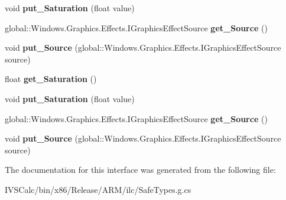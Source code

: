 \begin{DoxyCompactItemize}
void {\bfseries put\+\_\+\+Saturation} (float value)
\item 
\mbox{\label{interface_microsoft_1_1_graphics_1_1_canvas_1_1_effects_1_1_i_saturation_effect_a6d046df767aa40e632f84f8898bab4ee}} 
global\+::\+Windows.\+Graphics.\+Effects.\+I\+Graphics\+Effect\+Source {\bfseries get\+\_\+\+Source} ()
\item 
\mbox{\label{interface_microsoft_1_1_graphics_1_1_canvas_1_1_effects_1_1_i_saturation_effect_abeab04d73cf460ffaf84e878855471bd}} 
void {\bfseries put\+\_\+\+Source} (global\+::\+Windows.\+Graphics.\+Effects.\+I\+Graphics\+Effect\+Source source)
\item 
\mbox{\label{interface_microsoft_1_1_graphics_1_1_canvas_1_1_effects_1_1_i_saturation_effect_adecdc3257dffa4b9d889b825dee8bcfc}} 
float {\bfseries get\+\_\+\+Saturation} ()
\item 
\mbox{\label{interface_microsoft_1_1_graphics_1_1_canvas_1_1_effects_1_1_i_saturation_effect_a336f2121ed8c5134bdfb2dfbff7e6dc5}} 
void {\bfseries put\+\_\+\+Saturation} (float value)
\item 
\mbox{\label{interface_microsoft_1_1_graphics_1_1_canvas_1_1_effects_1_1_i_saturation_effect_a6d046df767aa40e632f84f8898bab4ee}} 
global\+::\+Windows.\+Graphics.\+Effects.\+I\+Graphics\+Effect\+Source {\bfseries get\+\_\+\+Source} ()
\item 
\mbox{\label{interface_microsoft_1_1_graphics_1_1_canvas_1_1_effects_1_1_i_saturation_effect_abeab04d73cf460ffaf84e878855471bd}} 
void {\bfseries put\+\_\+\+Source} (global\+::\+Windows.\+Graphics.\+Effects.\+I\+Graphics\+Effect\+Source source)
\end{DoxyCompactItemize}


The documentation for this interface was generated from the following file\+:\begin{DoxyCompactItemize}
\item 
I\+V\+S\+Calc/bin/x86/\+Release/\+A\+R\+M/ilc/Safe\+Types.\+g.\+cs\end{DoxyCompactItemize}
